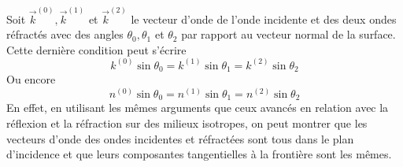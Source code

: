 Soit $\vec{k}^{(0)},\vec{k}^{(1)}$ et $\vec{k}^{(2)}$ le vecteur d'onde de l'onde incidente et des
deux ondes réfractés avec des angles $\theta_0,\theta_1$ et $\theta_2$ par rapport au vecteur normal
de la surface. Cette dernière condition peut s'écrire
\begin{equation}
k^{(0)}\sin\theta_0=k^{(1)}\sin\theta_1=k^{(2)}\sin\theta_2
\end{equation}
Ou encore
\begin{equation}
n^{(0)}\sin\theta_0=n^{(1)}\sin\theta_1=n^{(2)}\sin\theta_2
\end{equation}
En effet, en utilisant les mêmes arguments que ceux avancés en relation avec la réflexion et la 
réfraction sur des milieux isotropes, on peut montrer que les vecteurs d'onde des ondes incidentes 
et réfractées sont tous dans le plan d'incidence et que leurs composantes tangentielles à la frontière 
sont les mêmes.\\

